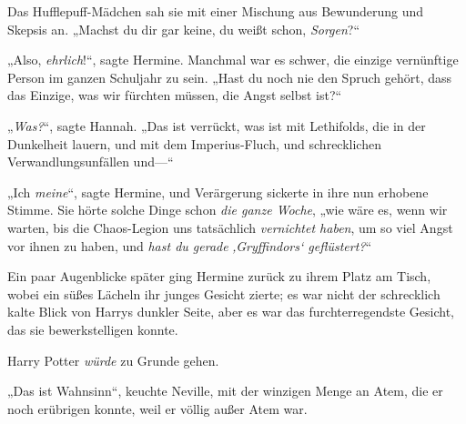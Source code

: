 Das Hufflepuff-Mädchen sah sie mit einer Mischung aus Bewunderung und Skepsis an. „Machst du dir gar keine, du weißt schon, \emph{Sorgen}?“

„Also, \emph{ehrlich}!“, sagte Hermine. Manchmal war es schwer, die einzige vernünftige Person im ganzen Schuljahr zu sein. „Hast du noch nie den Spruch gehört, dass das Einzige, was wir fürchten müssen, die Angst selbst ist?“

„\emph{Was?}“, sagte Hannah. „Das ist verrückt, was ist mit Lethifolds, die in der Dunkelheit lauern, und mit dem Imperius-Fluch, und schrecklichen Verwandlungsunfällen und—“

„Ich \emph{meine}“, sagte Hermine, und Verärgerung sickerte in ihre nun erhobene Stimme. Sie hörte solche Dinge schon \emph{die ganze Woche}, „wie wäre es, wenn wir warten, bis die Chaos-Legion uns tatsächlich \emph{vernichtet haben}, um so viel Angst vor ihnen zu haben, und \emph{hast du gerade} \emph{‚Gryffindors‘ geflüstert?}“

Ein paar Augenblicke später ging Hermine zurück zu ihrem Platz am Tisch, wobei ein süßes Lächeln ihr junges Gesicht zierte; es war nicht der schrecklich kalte Blick von Harrys dunkler Seite, aber es war das furchterregendste Gesicht, das sie bewerkstelligen konnte.

Harry Potter \emph{würde} zu Grunde gehen.

\later

„Das ist Wahnsinn“, keuchte Neville, mit der winzigen Menge an Atem, die er noch erübrigen konnte, weil er völlig außer Atem war.

